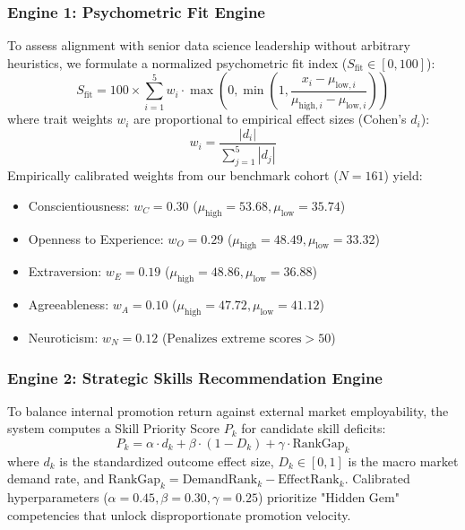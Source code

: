 \documentclass[conference]{IEEEtran}
\begin{document}
\subsubsection{Engine 1: Psychometric Fit Engine}
To assess alignment with senior data science leadership without arbitrary heuristics, we formulate a normalized psychometric fit index ($S_{\text{fit}} \in [0, 100]$):
\begin{equation}
S_{\text{fit}} = 100 \times \sum_{i=1}^{5} w_i \cdot \max\left(0, \min\left(1, \frac{x_i - \mu_{\text{low}, i}}{\mu_{\text{high}, i} - \mu_{\text{low}, i}}\right)\right)
\label{eq:fit_score}
\end{equation}
where trait weights $w_i$ are proportional to empirical effect sizes (Cohen's $d_i$):
\begin{equation}
w_i = \frac{|d_i|}{\sum_{j=1}^5 |d_j|}
\end{equation}
Empirically calibrated weights from our benchmark cohort ($N=161$) yield:
\begin{itemize}
    \item Conscientiousness: $w_C = 0.30$ ($\mu_{\text{high}} = 53.68, \mu_{\text{low}} = 35.74$)
    \item Openness to Experience: $w_O = 0.29$ ($\mu_{\text{high}} = 48.49, \mu_{\text{low}} = 33.32$)
    \item Extraversion: $w_E = 0.19$ ($\mu_{\text{high}} = 48.86, \mu_{\text{low}} = 36.88$)
    \item Agreeableness: $w_A = 0.10$ ($\mu_{\text{high}} = 47.72, \mu_{\text{low}} = 41.12$)
    \item Neuroticism: $w_N = 0.12$ ($\text{Penalizes extreme scores} > 50$)
\end{itemize}

\subsubsection{Engine 2: Strategic Skills Recommendation Engine}
To balance internal promotion return against external market employability, the system computes a Skill Priority Score $P_k$ for candidate skill deficits:
\begin{equation}
P_k = \alpha \cdot d_k + \beta \cdot (1 - D_k) + \gamma \cdot \text{RankGap}_k
\label{eq:skill_priority}
\end{equation}
where $d_k$ is the standardized outcome effect size, $D_k \in [0, 1]$ is the macro market demand rate, and $\text{RankGap}_k = \text{DemandRank}_k - \text{EffectRank}_k$. Calibrated hyperparameters ($\alpha=0.45, \beta=0.30, \gamma=0.25$) prioritize "Hidden Gem" competencies that unlock disproportionate promotion velocity.
\end{document}
